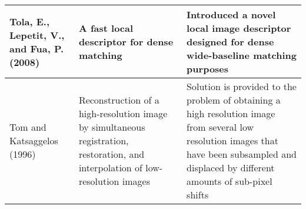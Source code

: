 \documentclass[12pt]{article}
\begin{document}
\begin{tabularx}{\textwidth}{| X | X | X | }
Tola, E., Lepetit, V., and Fua, P. (2008) & A fast local descriptor for dense matching & Introduced a novel local image descriptor designed for dense wide-baseline matching purposes \\ \hline

Tom and Katsaggelos (1996) & Reconstruction of a high-resolution image by simultaneous registration, restoration, and interpolation of low-resolution images & Solution is provided to the problem of obtaining a high resolution image from several low resolution images that have been subsampled and displaced by different amounts of sub-pixel shifts \\ \hline

\end{tabularx}
\end{document}
